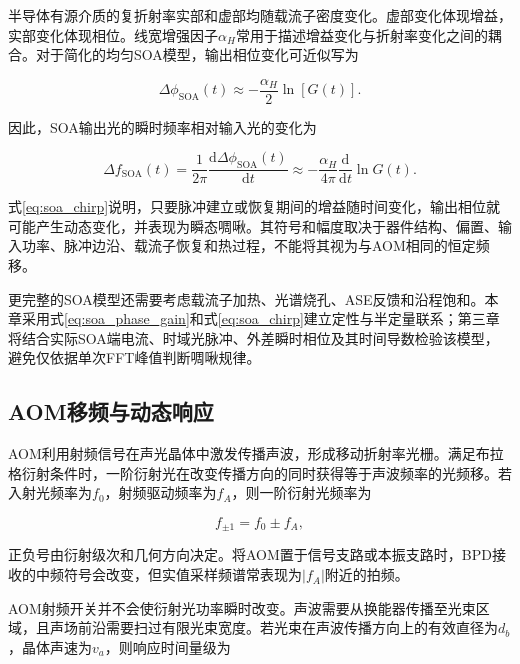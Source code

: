 半导体有源介质的复折射率实部和虚部均随载流子密度变化。虚部变化体现增益，实部变化体现相位。线宽增强因子$\alpha_H$常用于描述增益变化与折射率变化之间的耦合。对于简化的均匀SOA模型，输出相位变化可近似写为

\begin{equation}
\Delta\phi_{\mathrm{SOA}}(t)
\approx
-\frac{\alpha_H}{2}
\ln\left[G(t)\right].
\label{eq:soa_phase_gain}
\end{equation}

因此，SOA输出光的瞬时频率相对输入光的变化为

\begin{equation}
\Delta f_{\mathrm{SOA}}(t)
=
\frac{1}{2\pi}
\frac{\mathrm d\Delta\phi_{\mathrm{SOA}}(t)}{\mathrm dt}
\approx
-\frac{\alpha_H}{4\pi}
\frac{\mathrm d}{\mathrm dt}\ln G(t).
\label{eq:soa_chirp}
\end{equation}

式\eqref{eq:soa_chirp}说明，只要脉冲建立或恢复期间的增益随时间变化，输出相位就可能产生动态变化，并表现为瞬态啁啾。其符号和幅度取决于器件结构、偏置、输入功率、脉冲边沿、载流子恢复和热过程，不能将其视为与AOM相同的恒定频移\cite{cao2002characterization,matsuura2015chirp,sutili2021chirp,connelly2023dynamic}。

更完整的SOA模型还需要考虑载流子加热、光谱烧孔、ASE反馈和沿程饱和\cite{baveja2010selfphase,sobhanan2022soa}。本章采用式\eqref{eq:soa_phase_gain}和式\eqref{eq:soa_chirp}建立定性与半定量联系；第三章将结合实际SOA端电流、时域光脉冲、外差瞬时相位及其时间导数检验该模型，避免仅依据单次FFT峰值判断啁啾规律。

\subsection{AOM移频与动态响应}

AOM利用射频信号在声光晶体中激发传播声波，形成移动折射率光栅。满足布拉格衍射条件时，一阶衍射光在改变传播方向的同时获得等于声波频率的光频移。若入射光频率为$f_0$，射频驱动频率为$f_A$，则一阶衍射光频率为

\begin{equation}
f_{\pm1}=f_0\pm f_A,
\label{eq:aom_shift}
\end{equation}

正负号由衍射级次和几何方向决定。将AOM置于信号支路或本振支路时，BPD接收的中频符号会改变，但实值采样频谱常表现为$|f_A|$附近的拍频\cite{pan2011phase,lu2010distributed}。

AOM射频开关并不会使衍射光功率瞬时改变。声波需要从换能器传播至光束区域，且声场前沿需要扫过有限光束宽度。若光束在声波传播方向上的有效直径为$d_b$，晶体声速为$v_a$，则响应时间量级为

